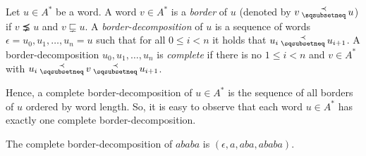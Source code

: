 \begin{definition}
	Let $u\in A^\ast$ be a word. A word $v\in A^*$ is a \emph{border} of $u$ (denoted by $v\presuf u$) if $v \precneq u$ and $v \sqsubsetneq u$. A \emph{border-decomposition} of $u$ is a sequence of words $\epsilon = u_0,u_1,\ldots, u_n = u$ such that for all $0\leq i < n$ it holds that
	$u_i \presuf u_{i+1}$. A border-decomposition $u_0,u_1,\ldots, u_n $ is \emph{complete} if there is no $1\leq i< n$ and $v\in A^\ast$ with $u_i \presuf v \presuf u_{i+1}$.
\end{definition}

Hence, a complete border-decomposition of $u\in A^*$ is the sequence of all borders of $u$ ordered by word length. So, it is easy to observe that each word $u\in A^*$ has exactly one complete border-decomposition.


\begin{example}
	The  complete border-decomposition of $ababa$ is $(\epsilon, a, aba, ababa)$.
\end{example}

%

